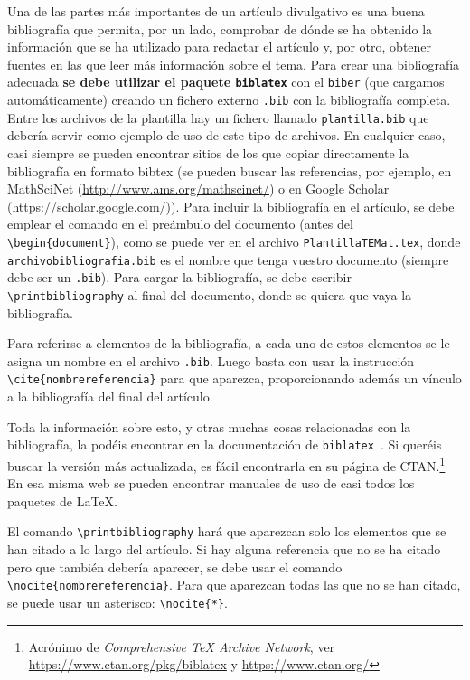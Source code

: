 \documentclass{TEMat-article}
\begin{document}
Una de las partes más importantes de un artículo divulgativo es una buena bibliografía que permita, por un lado, comprobar de dónde se ha obtenido la información que se ha utilizado para redactar el artículo y, por otro, obtener fuentes en las que leer más información sobre el tema.
Para crear una bibliografía adecuada \textbf{se debe utilizar el paquete \texttt{biblatex}} con el  \verb+biber+ (que cargamos automáticamente) creando un fichero externo \verb+.bib+ con la bibliografía completa.
Entre los archivos de la plantilla hay un fichero llamado \verb+plantilla.bib+ que debería servir como ejemplo de uso de este tipo de archivos.
En cualquier caso, casi siempre se pueden encontrar sitios de los que copiar directamente la bibliografía en formato bibtex (se pueden buscar las referencias, por ejemplo, en MathSciNet (\url{http://www.ams.org/mathscinet/}) o en Google Scholar (\url{https://scholar.google.com/})).
Para incluir la bibliografía en el artículo, se debe emplear el comando \verb++ en el preámbulo del documento (antes del \verb+\begin{document}+), como se puede ver en el archivo \verb+PlantillaTEMat.tex+, donde \verb+archivobibliografia.bib+ es el nombre que tenga vuestro documento (siempre debe ser un \verb+.bib+).
Para cargar la bibliografía, se debe escribir \verb+\printbibliography+ al final del documento, donde se quiera que vaya la bibliografía.

Para referirse a elementos de la bibliografía, a cada uno de estos elementos se le asigna un nombre en el archivo \verb+.bib+.
Luego basta con usar la instrucción \verb+\cite{nombrereferencia}+ para que aparezca, proporcionando además un vínculo a la bibliografía del final del artículo.

Toda la información sobre esto, y otras muchas cosas relacionadas con la bibliografía, la podéis encontrar en la documentación de \verb+biblatex+~\cite{biblatex}.
Si queréis buscar la versión más actualizada, es fácil encontrarla en su página de CTAN.\footnote{Acrónimo de \emph{Comprehensive \protect\TeX{} Archive Network}, ver \url{https://www.ctan.org/pkg/biblatex} y \url{https://www.ctan.org/}}
En esa misma web se pueden encontrar manuales de uso de casi todos los paquetes de \LaTeX.

\begin{nota}
El comando \verb+\printbibliography+ hará que aparezcan solo los elementos que se han citado a lo largo del artículo.
Si hay alguna referencia que no se ha citado pero que también debería aparecer, se debe usar el comando \verb+\nocite{nombrereferencia}+.
Para que aparezcan todas las que no se han citado, se puede usar un asterisco: \verb+\nocite{*}+.
\end{nota}
\end{document}
